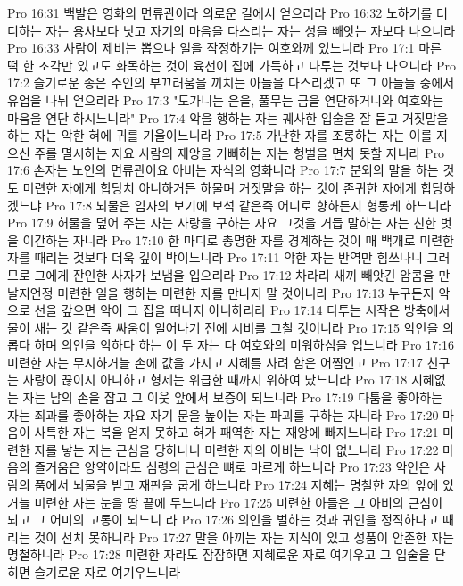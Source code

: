 Pro 16:31  백발은 영화의 면류관이라 의로운 길에서 얻으리라
Pro 16:32  노하기를 더디하는 자는 용사보다 낫고 자기의 마음을 다스리는 자는 성을 빼앗는 자보다 나으니라
Pro 16:33  사람이 제비는 뽑으나 일을 작정하기는 여호와께 있느니라
Pro 17:1  마른 떡 한 조각만 있고도 화목하는 것이 육선이 집에 가득하고 다투는 것보다 나으니라
Pro 17:2  슬기로운 종은 주인의 부끄러움을 끼치는 아들을 다스리겠고 또 그 아들들 중에서 유업을 나눠 얻으리라
Pro 17:3  "도가니는 은을, 풀무는 금을 연단하거니와 여호와는 마음을 연단 하시느니라"
Pro 17:4  악을 행하는 자는 궤사한 입술을 잘 듣고 거짓말을 하는 자는 악한 혀에 귀를 기울이느니라
Pro 17:5  가난한 자를 조롱하는 자는 이를 지으신 주를 멸시하는 자요 사람의 재앙을 기뻐하는 자는 형벌을 면치 못할 자니라
Pro 17:6  손자는 노인의 면류관이요 아비는 자식의 영화니라
Pro 17:7  분외의 말을 하는 것도 미련한 자에게 합당치 아니하거든 하물며 거짓말을 하는 것이 존귀한 자에게 합당하겠느냐
Pro 17:8  뇌물은 임자의 보기에 보석 같은즉 어디로 향하든지 형통케 하느니라
Pro 17:9  허물을 덮어 주는 자는 사랑을 구하는 자요 그것을 거듭 말하는 자는 친한 벗을 이간하는 자니라
Pro 17:10  한 마디로 총명한 자를 경계하는 것이 매 백개로 미련한 자를 때리는 것보다 더욱 깊이 박이느니라
Pro 17:11  악한 자는 반역만 힘쓰나니 그러므로 그에게 잔인한 사자가 보냄을 입으리라
Pro 17:12  차라리 새끼 빼앗긴 암콤을 만날지언정 미련한 일을 행하는 미련한 자를 만나지 말 것이니라
Pro 17:13  누구든지 악으로 선을 갚으면 악이 그 집을 떠나지 아니하리라
Pro 17:14  다투는 시작은 방축에서 물이 새는 것 같은즉 싸움이 일어나기 전에 시비를 그칠 것이니라
Pro 17:15  악인을 의롭다 하며 의인을 악하다 하는 이 두 자는 다 여호와의 미워하심을 입느니라
Pro 17:16  미련한 자는 무지하거늘 손에 값을 가지고 지혜를 사려 함은 어찜인고
Pro 17:17  친구는 사랑이 끊이지 아니하고 형제는 위급한 때까지 위하여 났느니라
Pro 17:18  지혜없는 자는 남의 손을 잡고 그 이웃 앞에서 보증이 되느니라
Pro 17:19  다툼을 좋아하는 자는 죄과를 좋아하는 자요 자기 문을 높이는 자는 파괴를 구하는 자니라
Pro 17:20  마음이 사특한 자는 복을 얻지 못하고 혀가 패역한 자는 재앙에 빠지느니라
Pro 17:21  미련한 자를 낳는 자는 근심을 당하나니 미련한 자의 아비는 낙이 없느니라
Pro 17:22  마음의 즐거움은 양약이라도 심령의 근심은 뼈로 마르게 하느니라
Pro 17:23  악인은 사람의 품에서 뇌물을 받고 재판을 굽게 하느니라
Pro 17:24  지혜는 명철한 자의 앞에 있거늘 미련한 자는 눈을 땅 끝에 두느니라
Pro 17:25  미련한 아들은 그 아비의 근심이 되고 그 어미의 고통이 되느니 라
Pro 17:26  의인을 벌하는 것과 귀인을 정직하다고 때리는 것이 선치 못하니라
Pro 17:27  말을 아끼는 자는 지식이 있고 성품이 안존한 자는 명철하니라
Pro 17:28  미련한 자라도 잠잠하면 지혜로운 자로 여기우고 그 입술을 닫히면 슬기로운 자로 여기우느니라
